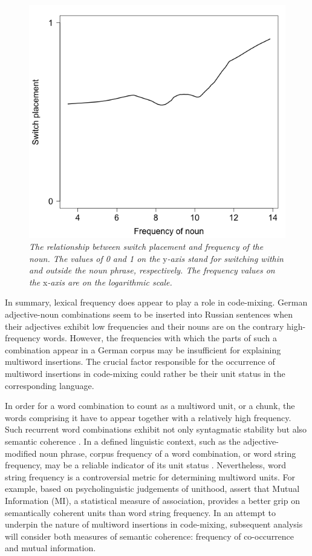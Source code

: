 \begin{figure}
	\centering
    	\includegraphics[scale=0.5]{figures/4-Fr_N.png}
	\caption{\textit{The relationship between switch placement and frequency of the noun. The values of 0 and 1 on the} y\textit{-axis stand for switching within and outside the noun phrase, respectively. The frequency values on the} x\textit{-axis are on the logarithmic scale.}}
	\label{fig:4:noun}
\end{figure}

In summary, lexical frequency does appear to play a role in code-mixing. German adjective-noun combinations seem to be inserted into Russian sentences when their adjectives exhibit low frequencies and their nouns are on the contrary high-frequency words. However, the frequencies with which the parts of such a combination appear in a German corpus may be insufficient for explaining multiword insertions. The crucial factor responsible for the occurrence of multiword insertions in code-mixing could rather be their unit status in the corresponding language. 

In order for a word combination to count as a multiword unit, or a chunk, the words comprising it have to appear together with a relatively high frequency. Such recurrent word combinations exhibit not only syntagmatic stability but also semantic coherence \citep[cf.][136]{bybee-book-2010}. In a defined linguistic context, such as the adjective-modified noun phrase, corpus frequency of a word combination, or word string frequency, may be a reliable indicator of its unit status \citep[][]{heylen-2014}. Nevertheless, word string frequency is a controversial metric for determining multiword units. For example, based on psycholinguistic judgements of unithood, \citet{simpson.vlach&ellis2010} assert that Mutual Information (MI), a statistical measure of association, provides a better grip on semantically coherent units than word string frequency. In an attempt to underpin the nature of multiword insertions in code-mixing, subsequent analysis will consider both measures of semantic coherence:  frequency of co-occurrence and mutual information.  

